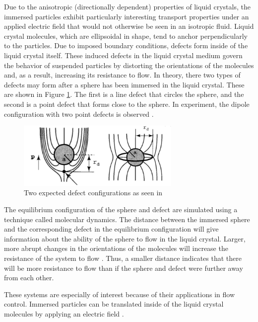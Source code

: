 \documentclass[preprint, aps]{revtex4-1}
\begin{document}
Due to the anisotropic (directionally dependent) properties of liquid crystals, 
the immersed particles exhibit particularly interesting transport properties 
under an applied electric field that would not otherwise be seen in an isotropic 
fluid. Liquid crystal molecules, which are ellipsoidal in shape, tend to anchor 
perpendicularly to the particles. Due to imposed boundary conditions, defects 
form inside of the liquid crystal itself. These induced defects in the liquid 
crystal medium govern the behavior of suspended particles by distorting the 
orientations of the molecules and, as a result, increasing its resistance to
flow. In theory, there two types of defects may form after a sphere has been 
immersed in the liquid crystal. These are shown in Figure 
\ref{fig:defect-config}. The first is a line defect that circles the sphere, 
and the second is a point defect that forms close to the sphere. In experiment, 
the dipole configuration with two point defects is observed \cite{lubensky98}.
	\begin{figure}[H]
		\centering
		\includegraphics[width=0.7\textwidth]{defect-config.png}
		\caption{Two expected defect configurations as seen in 
		\cite{lubensky98}}
		\label{fig:defect-config}
	\end{figure}

The equilibrium configuration of the sphere and defect are simulated using a
technique called molecular dynamics. The distance between the immersed sphere 
and the corresponding defect in the equilibrium configuration will give 
information about the ability of the sphere to flow in the liquid crystal. 
Larger, more abrupt changes in the orientations of the molecules will increase 
the resistance of the system to flow \cite{billeter00}. Thus, a smaller distance
indicates that there will be more resistance to flow than if the sphere and
defect were further away from each other.

These systems are especially of interest because of their applications in flow 
control. Immersed particles can be translated inside of the liquid crystal
molecules by applying an electric field \cite{conklin17}. 
\end{document}
